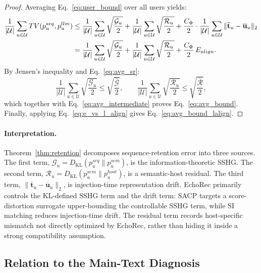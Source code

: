 ﻿\documentclass{article}
\begin{document}
\begin{proof}
Averaging Eq.~\eqref{eq:user_bound} over all users yields:
\begin{align}
\frac{1}{|\mathcal U|}\sum_{u\in\mathcal U}TV(p_u^{seq},p_u^{llm})
&\le
\frac{1}{|\mathcal U|}\sum_{u\in\mathcal U}\sqrt{\frac{\mathcal G_u}{2}}
+
\frac{1}{|\mathcal U|}\sum_{u\in\mathcal U}\sqrt{\frac{\mathcal R_u}{2}}
+
\frac{C_\Phi}{2}\cdot
\frac{1}{|\mathcal U|}\sum_{u\in\mathcal U}\|\overline{\mathbf{t}}_u-\overline{\mathbf{u}}_u\|_2 \notag\\
&= 
\frac{1}{|\mathcal U|}\sum_{u\in\mathcal U}\sqrt{\frac{\mathcal G_u}{2}}
+
\frac{1}{|\mathcal U|}\sum_{u\in\mathcal U}\sqrt{\frac{\mathcal R_u}{2}}
+
\frac{C_\Phi}{2}\,E_{align}.
\label{eq:avg_intermediate}
\end{align}
By Jensen's inequality and Eq.~\eqref{eq:avg_sr}:
\begin{equation}
\frac{1}{|\mathcal U|}\sum_{u\in\mathcal U}\sqrt{\frac{\mathcal G_u}{2}}
\le
\sqrt{\frac{\bar{\mathcal G}}{2}},
\qquad
\frac{1}{|\mathcal U|}\sum_{u\in\mathcal U}\sqrt{\frac{\mathcal R_u}{2}}
\le
\sqrt{\frac{\bar{\mathcal R}}{2}},
\end{equation}
which together with Eq.~\eqref{eq:avg_intermediate} proves Eq.~\eqref{eq:avg_bound}. Finally, applying Eq.~\eqref{eq:e_vs_l_align} gives Eq.~\eqref{eq:avg_bound_lalign}.
\end{proof}

\paragraph{Interpretation.}
Theorem~\ref{thm:retention} decomposes sequence-retention error into three sources. The first term, $\mathcal G_u=D_{\mathrm{KL}}(p_u^{seq}\|p_u^{sem})$, is the information-theoretic SSHG. The second term, $\mathcal R_u=D_{\mathrm{KL}}(p_u^{sem}\|p_u^{host})$, is a semantic-host residual. The third term, $\|\overline{\mathbf{t}}_u-\overline{\mathbf{u}}_u\|_2$, is injection-time representation drift. EchoRec primarily controls the KL-defined SSHG term and the drift term: SACP targets a score-distortion surrogate upper-bounding the controllable SSHG term, while SI matching reduces injection-time drift. The residual term records host-specific mismatch not directly optimized by EchoRec, rather than hiding it inside a strong compatibility assumption.

\subsection{Relation to the Main-Text Diagnosis}
\label{app:diagnosis_relation}
\end{document}
